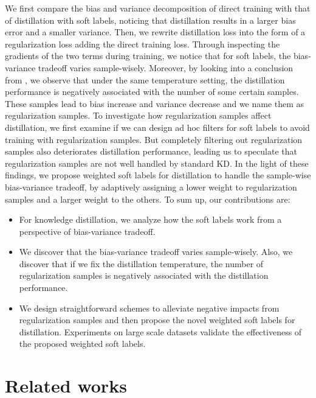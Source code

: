 \documentclass{article} \usepackage{iclr2021_conference,times}
\begin{document}
We first compare the bias and variance decomposition of direct training with that of distillation with soft labels, noticing that distillation results in a larger bias error and a smaller variance. 
Then, we rewrite distillation loss into the form of a regularization loss adding the direct training loss. 
Through inspecting the gradients of the two terms during training, we notice that for soft labels, the bias-variance tradeoff varies sample-wisely. Moreover, by looking into a conclusion from \citep{muller2019does}, we observe that under the same temperature setting, the distillation performance is negatively associated with the number of some certain samples. These samples lead to bias increase and variance decrease and we name them as regularization samples.  
To investigate how regularization samples affect distillation, we first examine if we can design ad hoc filters for soft labels to avoid training with regularization samples. But completely filtering out regularization samples also deteriorates distillation performance, leading us to speculate that regularization samples are not well handled by standard KD.
In the light of these findings, we propose weighted soft labels for distillation to handle the sample-wise bias-variance tradeoff, by adaptively assigning a lower weight to regularization samples and a larger weight to the others. 
To sum up, our contributions are:
\vspace{-5pt}
\begin{itemize}
\item For knowledge distillation, we analyze how the soft labels work from a perspective of bias-variance tradeoff.
\vspace{-2pt}
\item We discover that the bias-variance tradeoff varies sample-wisely. Also, we discover that if we fix the distillation temperature, the number of regularization samples is negatively associated with the distillation performance.
\vspace{-2pt}
\item We design straightforward schemes to alleviate negative impacts from regularization samples and then propose the novel weighted soft labels for distillation. Experiments on large scale datasets validate the effectiveness of the proposed weighted soft labels.
\vspace{-5pt}
\end{itemize}

\vspace{-5pt}
\section{Related works}
\vspace{-5pt}
\end{document}
